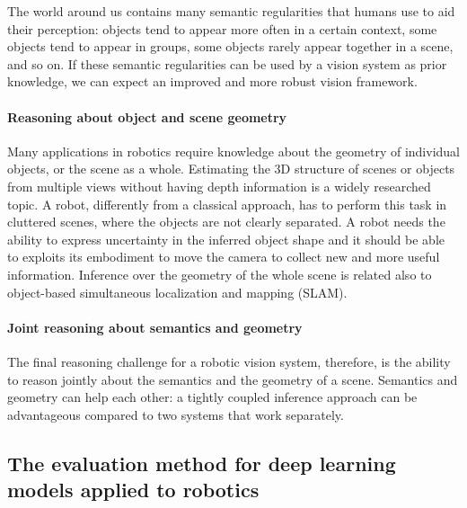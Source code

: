 The world around us contains many semantic regularities that humans use
to aid their perception: objects tend to appear more often in a certain
context, some objects tend to appear in groups, some objects rarely
appear together in a scene, and so on. If these semantic regularities
can be used by a vision system as prior knowledge, we can expect an
improved and more robust vision framework.

\paragraph{Reasoning about object and scene geometry}

Many applications in robotics require knowledge about the geometry of
individual objects, or the scene as a whole. Estimating the 3D structure
of scenes or objects from multiple views without having depth
information is a widely researched topic. A robot, differently from a
classical approach, has to perform this task in cluttered scenes, where
the objects are not clearly separated. A robot needs the ability to
express uncertainty in the inferred object shape and it should be able
to exploits its embodiment to move the camera to collect new and more
useful information. Inference over the geometry of the whole scene is
related also to object-based simultaneous localization and mapping
(SLAM).

\paragraph{Joint reasoning about semantics and geometry}

The final reasoning challenge for a robotic vision system, therefore, is
the ability to reason jointly about the semantics and the geometry of a
scene. Semantics and geometry can help each other: a tightly coupled
inference approach can be advantageous compared to two systems that work
separately.

\subsection{The evaluation method for deep learning models applied to
robotics}\label{header-n41}

